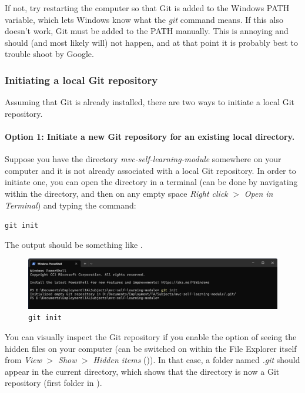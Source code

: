 \documentclass[a4paper,10pt]{article}
\begin{document}
If not, try restarting the computer so that Git is added to the Windows PATH variable, which lets Windows know what the \emph{git} command means. If this also doesn't work, Git must be added to the PATH manually. This is annoying and should (and most likely will) not happen, and at that point it is probably best to trouble shoot by Google.

\subsubsection{Initiating a local Git repository}
\label{sec:git_init}

Assuming that Git is already installed, there are two ways to initiate a local Git repository.

\paragraph{Option 1: Initiate a new Git repository for an existing local directory.} Suppose you have the directory \emph{mvc-self-learning-module} somewhere on your computer and it is not already associated with a local Git repository. In order to initiate one, you can open the directory in a terminal (can be done by navigating within the directory, and then on any empty space \emph{Right click} $>$ \emph{Open in Terminal}) and typing the command: 

\texttt{git init}

The output should be something like .

\begin{figure}[htbp]
    \centering
    \includegraphics[width=\textwidth]{git_init.png}
    \caption{\texttt{git init}}
    \label{fig:git_init}   
\end{figure}


You can visually inspect the Git repository if you enable the option of seeing the hidden files on your computer (can be switched on within the File Explorer itself from \emph{View} $>$ \emph{Show} $>$ \emph{Hidden items} ()). In that case, a folder named \emph{.git} should appear in the current directory, which shows that the directory is now a Git repository (first folder in ). 
\end{document}
